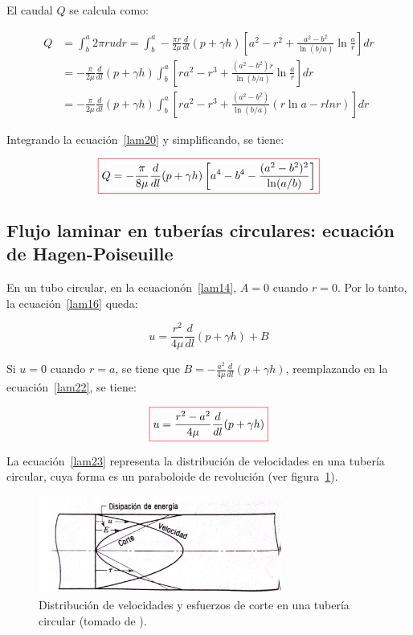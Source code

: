 \documentclass[11pt, oneside]{article}
\begin{document}
El caudal $Q$ se calcula como:

\begin{equation}
\begin{split}
Q & = \int_b^a 2\pi r u dr = \int_b^a -\frac{\pi r}{2\mu}\frac{d}{dl}(p + \gamma h) \left[  a^2 - r^2 + \frac{a^2 - b^2}{\ln(b/a)} \ln \frac{a}{r} \right ] dr \\
& = -\frac{\pi}{2\mu}\frac{d}{dl}(p + \gamma h)\int_b^a \left[ r a^2 - r^3 + \frac{(a^2 - b^2 )r}{\ln(b/a)}\ln \frac{a}{r} \right]dr \\
& = -\frac{\pi}{2\mu}\frac{d}{dl}(p + \gamma h)\int_b^a \left[ r a^2 - r^3 + \frac{(a^2 - b^2 )}{\ln(b/a)}(r\ln a - r ln r) \right]dr 
\end{split}
\label{lam20}
\end{equation}

Integrando la ecuaci\'on~\ref{lam20} y simplificando, se tiene:

\begin{equation}
\color{red}\boxed{\color{black} Q = -\frac{\pi}{8\mu}\frac{d}{dl}(p + \gamma h) \left[ a^4 - b^4 - \frac{(a^2 - b^2)^2 }{\ln (a/b)} \right]  }
\label{lam21}
\end{equation}

\subsection{Flujo laminar en tuber\'ias circulares: ecuaci\'on de Hagen-Poiseuille} %
En un tubo circular, en la ecuacion\'on~\ref{lam14},  $A=0$ cuando $r=0$. Por lo tanto, la ecuaci\'on~\ref{lam16} queda:

\begin{equation}
u = \frac{r^2}{4\mu}\frac{d}{dl}(p + \gamma h) + B 
\label{lam22}
\end{equation}

Si $u=0$ cuando $r=a$, se tiene que $B=-\frac{a^2}{4\mu}\frac{d}{dl}(p + \gamma h)$, reemplazando en la ecuaci\'on~\ref{lam22}, se tiene:

\begin{equation}
\color{red}\boxed{\color{black} u = \frac{r^2 - a^2}{4\mu}\frac{d}{dl}(p + \gamma h) }
\label{lam23}
\end{equation}

La ecuaci\'on~\ref{lam23} representa la distribuci\'on de velocidades en una tuber\'ia circular, cuya forma es un paraboloide de revoluci\'on (ver figura~\ref{lamc1}). 

\begin{figure}[h]
\centering
\includegraphics[width=8cm]{lamc1.jpeg}
\caption{Distribuci\'on de velocidades y esfuerzos de corte en una tuber\'ia circular (tomado de \cite{streeter}).}
\label{lamc1}
\end{figure}
\end{document}
